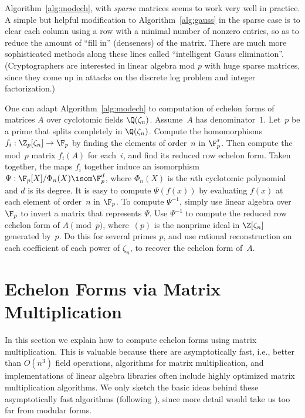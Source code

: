 \begin{remark}




 Algorithm~\ref{alg:modech}, with {\em sparse} matrices seems to
  work very well in practice.  A simple but helpful
  modification to Algorithm~\ref{alg:gauss} in the sparse case is to
  clear each column using a row with a minimal number of nonzero
  entries, so as to reduce the amount of ``fill in'' (denseness) of
  the matrix.  There are much more sophisticated methods along these
  lines called ``intelligent Gauss elimination''.  (Cryptographers are
  interested in linear algebra mod $p$ with huge sparse matrices,
  since they come up in attacks on the discrete log problem and
  integer factorization.)
\end{remark}


One can adapt Algorithm~\ref{alg:modech} to computation of 
echelon forms of matrices $A$ over cyclotomic fields $\Q(\zeta_n)$.
Assume~$A$ has denominator~$1$. Let~$p$ be a prime that splits
completely in $\Q(\zeta_n)$.  Compute the homomorphisms $f_i :
\Z_p[\zeta_n] \to \F_p$ by finding the elements of order~$n$ in
$\F_p^*$.  Then compute the mod~$p$ matrix $f_i(A)$ for each~$i$, and
find its reduced row echelon form.  Taken together, the maps $f_i$
together induce an isomorphism $\Psi:\F_p[X]/\Phi_n(X) \isom \F_p^d$,
where $\Phi_n(X)$ is the $n$th cyclotomic polynomial and $d$ is its
degree.  It is easy to compute $\Psi(f(x))$ by evaluating $f(x)$ at
each element of order~$n$ in $\F_p$.  To compute $\Psi^{-1}$, simply
use linear algebra over $\F_p$ to invert a matrix that represents
$\Psi$.  Use $\Psi^{-1}$ to compute the reduced row echelon form of
$A\pmod{p}$, where~$(p)$ is the nonprime ideal in $\Z[\zeta_n]$
generated by~$p$.  Do this for several primes $p$, and use rational
reconstruction on each coefficient of each power of $\zeta_n$, to
recover the echelon form of~$A$. 

\section{Echelon Forms via Matrix Multiplication}
\label{sec:echmatmul}

In this section we explain
how to compute echelon forms using matrix multiplication.  This is
valuable because there are asymptotically fast, i.e., better than
$O(n^3)$ field operations, algorithms for matrix multiplication, and
implementations of linear algebra libraries often include
highly optimized matrix multiplication algorithms.
We only sketch the basic ideas 
behind these asymptotically fast algorithms (following \cite{steel:talk}), since more 
detail would take us too far from modular forms.  

